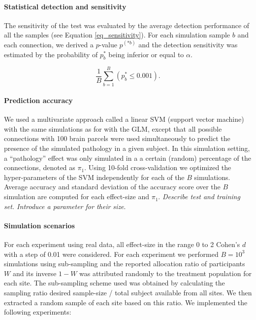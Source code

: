 \documentclass[authoryear]{elsarticle}
\begin{document}
\paragraph{Statistical detection and sensitivity} The sensitivity of the test was evaluated by the average detection performance of all the samples (see Equation \ref{eq_sensitivity}). For each simulation sample $b$ and each connection, we derived a $p$-value $p^{(*b)}$ and the detection sensitivity was estimated by the probability of $p^{*}_b$ being inferior or equal to $\alpha$.

\begin{equation}
   \frac{1}{B}\sum\limits_{b=1}^B\left(p^{*}_b\leq0.001\right).
   \label{eq_sensitivity}
\end{equation}


\paragraph{Prediction accuracy}
We used a multivariate approach called a linear SVM (support vector machine) \citep{Cortes1995} with the same simulations as for with the GLM, except that all possible connections with 100 brain parcels were used simultaneously to predict the presence of the simulated pathology in a given subject. In this simulation setting, a ``pathology'' effect was only simulated in a a certain (random) percentage of the connections, denoted as $\pi_1$. Using 10-fold cross-validation we optimized the hyper-parameters of the SVM independently for each of the $B$ simulations. Average accuracy and standard deviation of the accuracy score over the $B$ simulation are computed for each effect-size and $\pi_1$. \emph{Describe test and training set. Introduce a parameter for their size}. 

\paragraph{Simulation scenarios}
For each experiment using real data, all effect-size in the range 0 to 2 Cohen’s $d$ with a step of 0.01 were considered. For each experiment we performed $B=10^3$ simulations using sub-sampling and the reported allocation ratio of participants $W$ and its inverse $1-W$ was attributed randomly to the treatment population for each site. The sub-sampling scheme used was obtained by calculating the sampling ratio desired sample-size / total subject available from all sites. We then extracted a random sample of each site based on this ratio. We implemented the following experiments:
\end{document}
